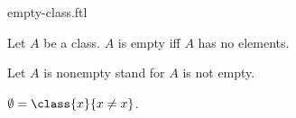 \documentclass{stex}
\begin{document}
\begin{smodule}{empty-class.ftl}

  \begin{forthel}
    \begin{definition}
      Let $A$ be a class.
      $A$ is empty iff $A$ has no elements.
    \end{definition}

    Let $A$ is nonempty stand for $A$ is not empty.
  \end{forthel}

  \begin{forthel}
    \begin{definition}
      $\emptyset = \class{x}{x \neq x}$.
    \end{definition}
  \end{forthel}
\end{smodule}
\end{document}
